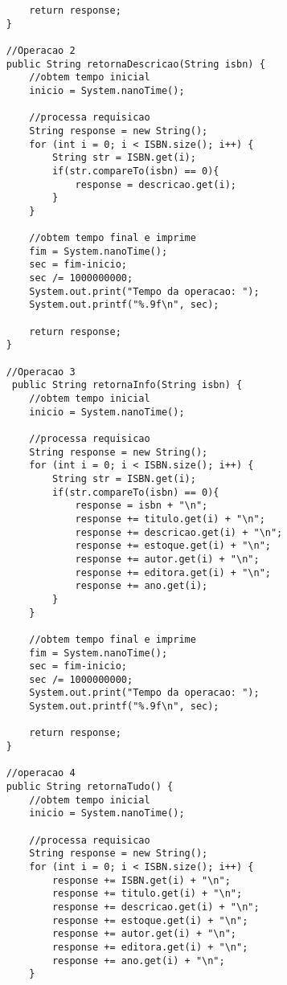 \documentclass[11pt, brazil]{article} %
\begin{document}
\begin{verbatim}
        return response;
    }
    
    //Operacao 2
    public String retornaDescricao(String isbn) {
    	//obtem tempo inicial
    	inicio = System.nanoTime();
    		
    	//processa requisicao
    	String response = new String();
        for (int i = 0; i < ISBN.size(); i++) {
            String str = ISBN.get(i);
            if(str.compareTo(isbn) == 0){
                response = descricao.get(i);
            }
        }
	
        //obtem tempo final e imprime
    	fim = System.nanoTime();
        sec = fim-inicio;
        sec /= 1000000000;
        System.out.print("Tempo da operacao: ");
        System.out.printf("%.9f\n", sec);
	    
        return response;
    }
    
    //Operacao 3
     public String retornaInfo(String isbn) {
    	//obtem tempo inicial
    	inicio = System.nanoTime();
   	
    	//processa requisicao
        String response = new String();
        for (int i = 0; i < ISBN.size(); i++) {
            String str = ISBN.get(i);
            if(str.compareTo(isbn) == 0){
                response = isbn + "\n";
                response += titulo.get(i) + "\n";
                response += descricao.get(i) + "\n";
                response += estoque.get(i) + "\n";
                response += autor.get(i) + "\n";
                response += editora.get(i) + "\n";
                response += ano.get(i);
            }
        }
		
        //obtem tempo final e imprime 
    	fim = System.nanoTime();
        sec = fim-inicio;
        sec /= 1000000000;
        System.out.print("Tempo da operacao: ");
        System.out.printf("%.9f\n", sec);
		
        return response;
    }

    //operacao 4
    public String retornaTudo() {
    	//obtem tempo inicial
    	inicio = System.nanoTime();
    	
        //processa requisicao
        String response = new String();
        for (int i = 0; i < ISBN.size(); i++) {
            response += ISBN.get(i) + "\n";
            response += titulo.get(i) + "\n";
            response += descricao.get(i) + "\n";
            response += estoque.get(i) + "\n";
            response += autor.get(i) + "\n";
            response += editora.get(i) + "\n";
            response += ano.get(i) + "\n";          
        }


\end{verbatim}
\end{document}
